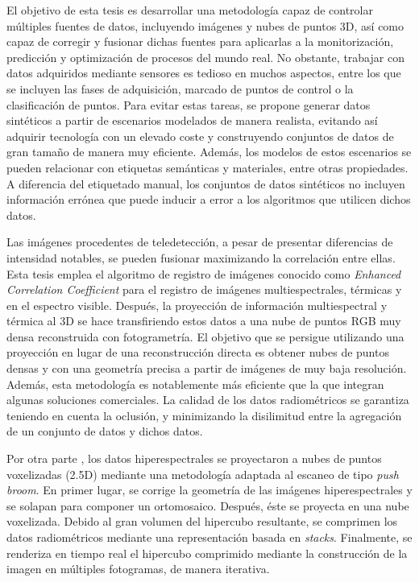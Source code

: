 \newpage
{}

\normalsize
\libertineNormal

El objetivo de esta tesis es desarrollar una metodología capaz de controlar múltiples fuentes de datos, incluyendo imágenes y nubes de puntos 3D, así como capaz de corregir y fusionar dichas fuentes para aplicarlas a la monitorización, predicción y optimización de procesos del mundo real. No obstante, trabajar con datos adquiridos mediante sensores es tedioso en muchos aspectos, entre los que se incluyen las fases de adquisición, marcado de puntos de control o la clasificación de puntos. Para evitar estas tareas, se propone generar datos sintéticos a partir de escenarios modelados de manera realista, evitando así adquirir tecnología con un elevado coste y construyendo conjuntos de datos de gran tamaño de manera muy eficiente. Además, los modelos de estos escenarios se pueden relacionar con etiquetas semánticas y materiales, entre otras propiedades. A diferencia del etiquetado manual, los conjuntos de datos sintéticos no incluyen información errónea que puede inducir a error a los algoritmos que utilicen dichos datos.

Las imágenes procedentes de teledetección, a pesar de presentar diferencias de intensidad notables, se pueden fusionar maximizando la correlación entre ellas. Esta tesis emplea el algoritmo de registro de imágenes conocido como \textit{Enhanced Correlation Coefficient} para el registro de imágenes multiespectrales, térmicas y en el espectro visible. Después, la proyección de información multiespectral y térmica al 3D se hace transfiriendo estos datos a una nube de puntos RGB muy densa reconstruida con fotogrametría. El objetivo que se persigue utilizando una proyección en lugar de una reconstrucción directa es obtener nubes de puntos densas y con una geometría precisa a partir de imágenes de muy baja resolución. Además, esta metodología es notablemente más eficiente que la que integran algunas soluciones comerciales. La calidad de los datos radiométricos se garantiza teniendo en cuenta la oclusión, y minimizando la disilimitud entre la agregación de un conjunto de datos y dichos datos.

Por otra parte , los datos hiperespectrales se proyectaron a nubes de puntos voxelizadas (2.5D) mediante una metodología adaptada al escaneo de tipo \textit{push broom}. En primer lugar, se corrige la geometría de las imágenes hiperespectrales y se solapan para componer un ortomosaico. Después, éste se proyecta en una nube voxelizada. Debido al gran volumen del hipercubo resultante, se comprimen los datos radiométricos mediante una representación basada en \textit{stacks}. Finalmente, se renderiza en tiempo real el hipercubo comprimido mediante la construcción de la imagen en múltiples fotogramas, de manera iterativa.
 
